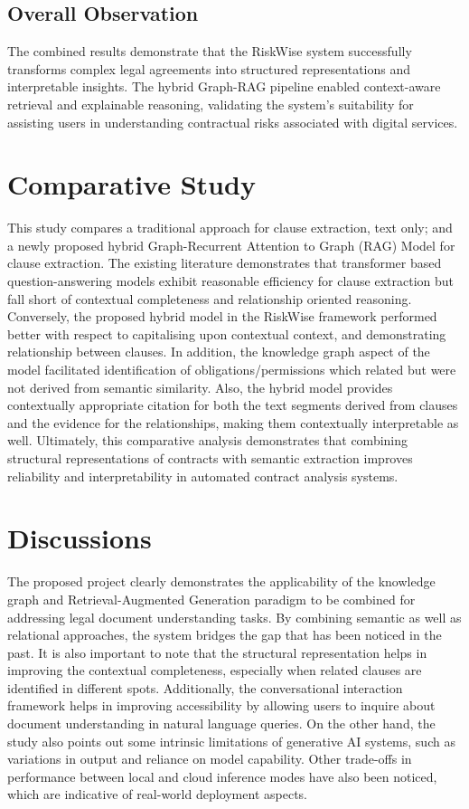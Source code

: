 \subsection{Overall Observation}
The combined results demonstrate that the RiskWise system
successfully transforms complex legal agreements into structured
representations and interpretable insights. The hybrid Graph-RAG
pipeline enabled context-aware retrieval and explainable reasoning,
validating the system’s suitability for assisting users in
understanding contractual risks associated with digital services.

\section{Comparative Study}
This study compares a traditional approach for clause extraction,
text only; and a newly proposed hybrid Graph-Recurrent Attention to
Graph (RAG) Model for clause extraction. The existing literature
demonstrates that transformer based question-answering models exhibit
reasonable efficiency for clause extraction but fall short of
contextual completeness and relationship oriented reasoning.
Conversely, the proposed hybrid model in the RiskWise framework
performed better with respect to capitalising upon contextual
context, and demonstrating relationship between clauses. In addition,
the knowledge graph aspect of the model facilitated identification of
obligations/permissions which related but were not derived from
semantic similarity. Also, the hybrid model provides contextually
appropriate citation for both the text segments derived from clauses
and the evidence for the relationships, making them contextually
interpretable as well. Ultimately, this comparative analysis
demonstrates that combining structural representations of contracts
with semantic extraction improves reliability and interpretability in
automated contract analysis systems.

\section{Discussions}
The proposed project clearly demonstrates the applicability of the
knowledge graph and Retrieval-Augmented Generation paradigm to be
combined for addressing legal document understanding tasks. By
combining semantic as well as relational approaches, the system
bridges the gap that has been noticed in the past. It is also
important to note that the structural representation helps in
improving the contextual completeness, especially when related
clauses are identified in different spots. Additionally, the
conversational interaction framework helps in improving accessibility
by allowing users to inquire about document understanding in natural
language queries. On the other hand, the study also points out some
intrinsic limitations of generative AI systems, such as variations in
output and reliance on model capability. Other trade-offs in
performance between local and cloud inference modes have also been
noticed, which are indicative of real-world deployment aspects.

